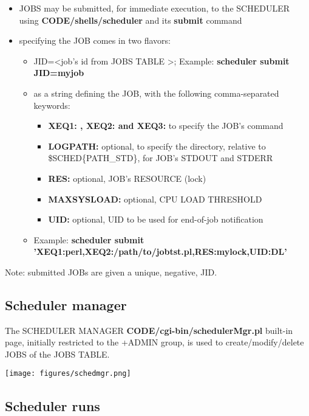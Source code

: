 \begin{itemize}
\item   JOBS may be submitted, for immediate execution, to the SCHEDULER using \textbf{CODE/shells/scheduler} and its \textbf{submit} command
\item   specifying the JOB comes in two flavors:
\begin{itemize}
\item   JID=\textless job's id from JOBS TABLE \textgreater ; Example: \textbf{scheduler submit JID=myjob}
\item   as a string defining the JOB, with the following comma-separated keywords:
\begin{itemize}
\item   \textbf{XEQ1: , XEQ2: and XEQ3:} to specify the JOB's command
\item   \textbf{LOGPATH:} optional, to specify the directory, relative to \$SCHED\{PATH\_STD\}, for JOB's STDOUT and STDERR
\item   \textbf{RES:} optional, JOB's RESOURCE (lock)
\item   \textbf{MAXSYSLOAD:} optional, CPU LOAD THRESHOLD
\item   \textbf{UID:} optional, UID to be used for end-of-job notification
\end{itemize}
\item   Example:  \textbf{scheduler submit 'XEQ1:perl,XEQ2:/path/to/jobtst.pl,RES:mylock,UID:DL'}
\end{itemize}
\end{itemize}

Note: submitted JOBs are given a unique, negative, JID. 

\subsection{Scheduler manager}

The SCHEDULER MANAGER \textbf{CODE/cgi-bin/schedulerMgr.pl} built-in page, initially restricted to the +ADMIN group, is used to create/modify/delete JOBS of the JOBS TABLE. 

\texttt{[image: figures/schedmgr.png]}

\subsection{Scheduler runs}

